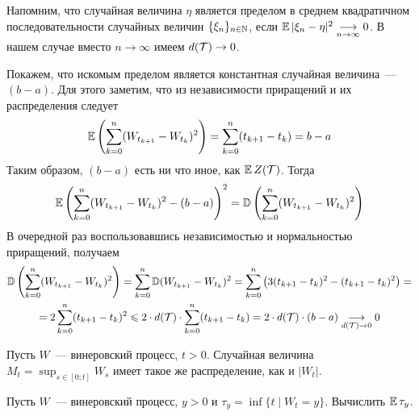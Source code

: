 \begin{solution}
    Напомним, что случайная величина $ \eta $ является пределом в среднем квадратичном последовательности случайных величин $ \{ \xi_n \}_{n \in \mathbb{N}} $,
    если $ \operatorname{\mathbb{E}} |\xi_n - \eta|^2 \underset{n \to \infty}{\longrightarrow} 0 $.
    В нашем случае вместо $ n \to \infty $ имеем $ d(\mathcal{T}) \to 0 $.

    Покажем, что искомым пределом является константная случайная величина~--- $ (b - a) $.
    Для этого заметим, что из независимости приращений и их распределения следует
    \[
        \operatorname{\mathbb{E}} \left( \sum_{k=0}^n (W_{t_{k+1}} - W_{t_k})^2 \right) = \sum_{k=0}^n (t_{k+1} - t_k) = b - a
    \]
    Таким образом, $ (b - a) $ есть ни что иное, как $ \operatorname{\mathbb{E}} Z(\mathcal{T}) $.
    Тогда
    \[
        \operatorname{\mathbb{E}} \left( \sum_{k=0}^n (W_{t_{k+1}} - W_{t_k})^2 - (b - a) \right)^2 = \operatorname{\mathbb{D}} \left( \sum_{k=0}^n (W_{t_{k+1}} - W_{t_k})^2 \right)
    \]
    В очередной раз воспользовавшись независимостью и нормальностью приращений, получаем
    \begin{multline*}
        \operatorname{\mathbb{D}} \left( \sum_{k=0}^n (W_{t_{k+1}} - W_{t_k})^2 \right) = \sum_{k=0}^n \operatorname{\mathbb{D}} (W_{t_{k+1}} - W_{t_k})^2 = \sum_{k=0}^n \left( 3 (t_{k+1} - t_k)^2 - (t_{k+1} - t_{k})^2 \right) = \\
        = 2 \sum_{k=0}^n (t_{k+1} - t_k)^2 \leqslant 2 \cdot d(\mathcal{T}) \cdot \sum_{k=0}^n (t_{k+1} - t_k) = 2 \cdot d(\mathcal{T}) \cdot (b - a) \underset{d(\mathcal{T}) \to 0}{\longrightarrow} 0
    \end{multline*}
\end{solution}


\begin{theorem}[Башелье]
    \label{theorem:special:Bachelier_theorem}
    Пусть $ W $~--- винеровский процесс, $ t > 0 $.
    Случайная величина $ M_t = \sup_{s \in [0; t]} W_s $ имеет такое же распределение, как и $ |W_t| $.
\end{theorem}


\begin{exercise}
    \label{exercise:special:Wiener_process_reach_point_time_expectation}
    Пусть $ W $~--- винеровский процесс, $ y > 0 $ и $ \tau_y = \inf \{ t \mid W_t = y \} $.
    Вычислить $ \operatorname{\mathbb{E}} \tau_y $.
\end{exercise}

